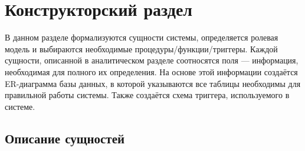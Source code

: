\chapter{Конструкторский раздел}

В данном разделе формализуются сущности системы, определяется ролевая модель и выбираются необходимые процедуры/функции/триггеры. Каждой сущности, описанной в аналитическом разделе соотносятся поля --- информация, необходимая для полного их определения. На основе этой информации создаётся ER-диаграмма базы данных, в которой указываются все таблицы необходимы для правильной работы системы. Также создаётся схема триггера, используемого в системе.

\section{Описание сущностей}

